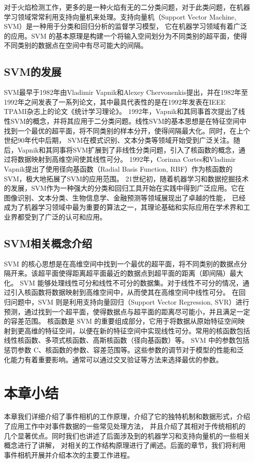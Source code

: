 对于火焰检测工作，更多的是一种火焰有无的二分类问题，对于此类问题，在机器学习领域常常利用支持向量机来处理。支持向量机（Support Vector Machine, SVM）是一种用于分类和回归分析的监督学习模型，
它在机器学习领域有着广泛的应用。SVM 的基本原理是构建一个将输入空间划分为不同类别的超平面，使得不同类别的数据点在空间中有尽可能大的间隔。
\subsection{SVM的发展}
SVM最早于1982年由Vladimir Vapnik和Alexey Chervonenkis提出，并在1982年至1992年之间发表了一系列论文，其中最具代表性的是在1992年发表在IEEE TPAMI杂志上的论文《统计学习理论》。
1992年，Vapnik和其同事首次提出了线性SVM的概念，并将其应用于二分类问题。线性SVM的基本思想是在特征空间中找到一个最优的超平面，将不同类别的样本分开，使得间隔最大化。同时，在上个世纪90年代中后期，
SVM在模式识别、文本分类等领域开始受到广泛关注。随后，Vapnik和其同事将SVM扩展到了非线性分类问题，引入了核函数的概念，通过将数据映射到高维空间使其线性可分。
1992年，Corinna Cortes和Vladimir Vapnik提出了使用径向基函数（Radial Basis Function, RBF）作为核函数的SVM，极大地拓展了SVM的应用范围。
21世纪初，随着机器学习和数据挖掘技术的发展，SVM作为一种强大的分类和回归工具开始在实践中得到广泛应用。它在图像识别、文本分类、生物信息学、金融预测等领域展现出了卓越的性能，
已经成为了机器学习领域中最为重要的算法之一，其理论基础和实际应用在学术界和工业界都受到了广泛的认可和应用。
\subsection{SVM相关概念介绍}
SVM 的核心思想是在高维空间中找到一个最优的超平面，将不同类别的数据点分隔开来。该超平面使得距离超平面最近的数据点到超平面的距离（即间隔）最大化。
SVM 能够处理线性可分和线性不可分的数据集。对于线性不可分的情况，通过引入核函数将数据映射到高维空间中，从而使其在高维空间中线性可分。
在回归问题中，SVM 则是利用支持向量回归（Support Vector Regression, SVR）进行预测，通过找到一个超平面，使得数据点与超平面的距离尽可能小，并且满足一定的容差范围。
核函数是 SVM 的重要组成部分，它用于将数据从原始特征空间映射到更高维的特征空间，以便在新的特征空间中实现线性可分。常用的核函数包括线性核函数、多项式核函数、高斯核函数（径向基函数）等。
SVM 中的参数包括惩罚参数 C、核函数的参数、容差范围等。这些参数的调节对于模型的性能和泛化能力有着重要影响。通常可以通过交叉验证等方法来选择最优的参数。






\section{本章小结}
本章我们详细介绍了事件相机的工作原理，介绍了它的独特机制和数据形式，介绍了应用工作中对事件数据的一些常见处理方法，
并且介绍了其相对于传统相机的几个显著优点。同时我们也讲述了后面涉及到的机器学习和支持向量机的一些相关概念进行了讲解，
对相关的工作结构原理进行了阐述。后面的章节，我们将利用事件相机开展并介绍本次的主要工作进程。